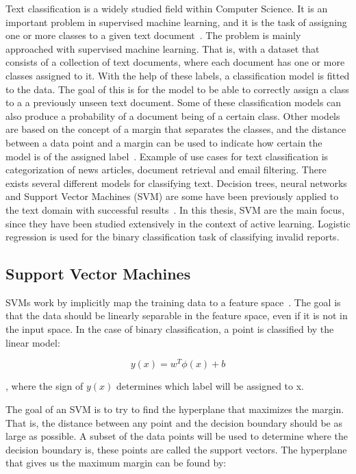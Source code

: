 Text classification is a widely studied field within Computer Science.
It is an important problem in supervised machine learning, and it is the task of assigning one or more classes to a given text document~\cite{aggarwal2012surveyclass}.
The problem is mainly approached with supervised machine learning.
That is, with a dataset that consists of a collection of text documents, where each document has one or more classes assigned to it. %
With the help of these labels, a classification model is fitted to the data.
The goal of this is for the model to be able to correctly assign a class to a a previously unseen text document.
Some of these classification models can also produce a probability of a document being of a certain class.
Other models are based on the concept of a margin that separates the classes, and the distance between a data point and a margin can be used to indicate how certain the model is of the assigned label~\cite{tong2001support}.
Example of use cases for text classification is categorization of news articles, document retrieval and email filtering.
There exists several different models for classifying text.
Decision trees, neural networks and Support Vector Machines (SVM) are some have been previously applied to the text domain with successful results~\cite{aggarwal2012survey}.
In this thesis, SVM are the main focus, since they have been studied extensively in the context of active learning. %
Logistic regression is used for the binary classification task of classifying invalid reports.

\subsection{Support Vector Machines}

SVMs work by implicitly map the training data to a feature space~\cite{bishop2006pattern}.
The goal is that the data should be linearly separable in the feature space, even if it is not in the input space.
In the case of binary classification, a point is classified by the linear model:

\begin{equation}\label{eq:svm-y}
    y(x) = w^T \phi(x) + b
\end{equation}

, where the sign of $y(x)$ determines which label will be assigned to x.

The goal of an SVM is to try to find the hyperplane that maximizes the margin.
That is, the distance between any point and the decision boundary should be as large as possible.
A subset of the data points will be used to determine where the decision boundary is, these points are called the support vectors.
The hyperplane that gives us the maximum margin can be found by:


